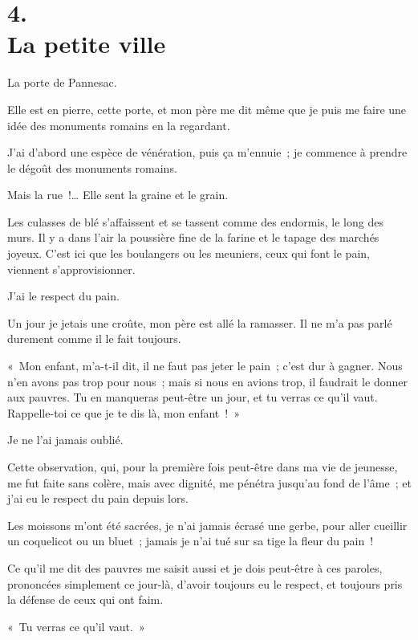 \documentclass[french,twoside]{book} %
\begin{document}
\section[{4. La petite ville}]{4. \\
La petite ville}\renewcommand{\leftmark}{4. \\
La petite ville}

\noindent La porte de Pannesac.\par
Elle est en pierre, cette porte, et mon père me dit même que je puis me faire une idée des monuments romains en la regardant.\par
J’ai d’abord une espèce de vénération, puis ça m’ennuie ; je commence à prendre le dégoût des monuments romains.\par
Mais la rue !… Elle sent la graine et le grain.\par
Les culasses de blé s’affaissent et se tassent comme des endormis, le long des murs. Il y a dans l’air la poussière fine de la farine et le tapage des marchés joyeux. C’est ici que les boulangers ou les meuniers, ceux qui font le pain, viennent s’approvisionner.\par
\bigbreak
\noindent J’ai le respect du pain.\par
Un jour je jetais une croûte, mon père est allé la ramasser. Il ne m’a pas parlé durement comme il le fait toujours.\par
« Mon enfant, m’a-t-il dit, il ne faut pas jeter le pain ; c’est dur à gagner. Nous n’en avons pas trop pour nous ; mais si nous en avions trop, il faudrait le donner aux pauvres. Tu en manqueras peut-être un jour, et tu verras ce qu’il vaut. Rappelle-toi ce que je te dis là, mon enfant ! »\par
Je ne l’ai jamais oublié.\par
Cette observation, qui, pour la première fois peut-être dans ma vie de jeunesse, me fut faite sans colère, mais avec dignité, me pénétra jusqu’au fond de l’âme ; et j’ai eu le respect du pain depuis lors.\par
Les moissons m’ont été sacrées, je n’ai jamais écrasé une gerbe, pour aller cueillir un coquelicot ou un bluet ; jamais je n’ai tué sur sa tige la fleur du pain !\par
Ce qu’il me dit des pauvres me saisit aussi et je dois peut-être à ces paroles, prononcées simplement ce jour-là, d’avoir toujours eu le respect, et toujours pris la défense de ceux qui ont faim.\par
« Tu verras ce qu’il vaut. »\par
\end{document}

